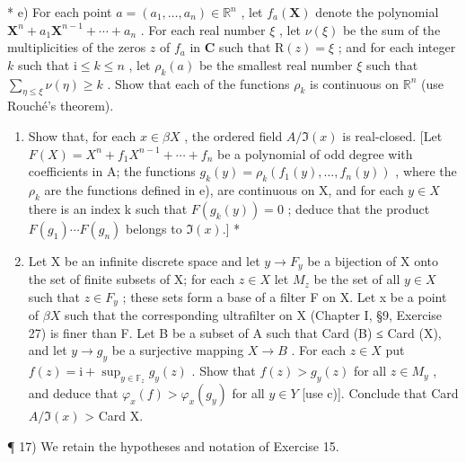 * e) For each point \(a = (a_{1}, \ldots, a_{n}) \in \mathbb{R}^{n}\) , let \(f_{a}(\mathbf{X})\) denote the polynomial \(\mathbf{X}^{n} + a_{1}\mathbf{X}^{n-1} + \cdots + a_{n}\) . For each real number \(\xi\) , let \(\nu(\xi)\) be the sum of the multiplicities of the zeros \(z\) of \(f_{a}\) in \(\mathbf{C}\) such that \(\mathrm{R}(z) = \xi\) ; and for each integer \(k\) such that \(\mathrm{i} \leqslant k \leqslant n\) , let \(\rho_{k}(a)\) be the smallest real number \(\xi\) such that \(\sum_{\eta \leqslant \xi} \nu(\eta) \geqslant k\) . Show that each of the functions \(\rho_{k}\) is continuous on \(\mathbb{R}^{n}\) (use Rouché's theorem).

\begin{enumerate}
\def\labelenumi{\alph{enumi})}
\setcounter{enumi}{5}
\item
  Show that, for each \(x \in \beta X\) , the ordered field \(A/\Im(x)\) is real-closed. {[}Let \(F(X) = X^{n} + f_{1}X^{n-1} + \cdots + f_{n}\) be a polynomial of odd degree with coefficients in A; the functions \(g_{k}(y) = \rho_{k}(f_{1}(y), \ldots, f_{n}(y))\) , where the \(\rho_{k}\) are the functions defined in e), are continuous on X, and for each \(y \in X\) there is an index k such that \(F(g_{k}(y)) = 0\) ; deduce that the product \(F(g_{1}) \cdots F(g_{n})\) belongs to \(\Im(x).]\) *
\item
  Let X be an infinite discrete space and let \(y \to F_y\) be a bijection of X onto the set of finite subsets of X; for each \(z \in X\) let \(M_z\) be the set of all \(y \in X\) such that \(z \in F_y\) ; these sets form a base of a filter F on X. Let x be a point of \(\beta X\) such that the corresponding ultrafilter on X (Chapter I, §9, Exercise 27) is finer than F. Let B be a subset of A such that Card (B) ≤ Card (X), and let \(y \to g_y\) be a surjective mapping \(X \to B\) . For each \(z \in X\) put \(f(z) = \mathrm{i} + \sup_{y \in \mathbb{F}_z} g_y(z)\) . Show that \(f(z) > g_y(z)\) for all \(z \in M_y\) , and deduce that \(\varphi_x(f) > \varphi_x(g_y)\) for all \(y \in Y\) {[}use c){]}. Conclude that Card \(A/\Im(x)\) \textgreater{} Card X.
\end{enumerate}

¶ 17) We retain the hypotheses and notation of Exercise 15.

